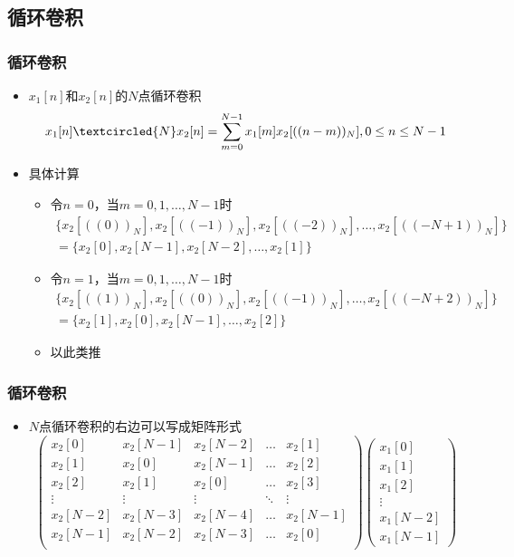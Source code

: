 \documentclass[CJKutf8,dvipsnames,table]{beamer}
\begin{document}
\begin{CJK*}{UTF8}{song}
  \section{循环卷积}
  
  \begin{frame}
    \frametitle{循环卷积}
    \begin{itemize}
    \item $x_1[n]$和$x_2[n]$的$N$点循环卷积
    \[
    	x_1[n] \textcircled{N} x_2[n]=\sum_{m=0}^{N-1}x_1[m]x_2[((n-m))_N], 0 \leq n \leq N-1
    \]    
    \item 具体计算
    	\begin{itemize}
		\item 令$n=0$，当$m=0, 1, \hdots, N-1$时
		\begin{align*}
			\{ x_2[((0))_N], x_2[((-1))_N], x_2[((-2))_N], \hdots, x_2[((-N+1))_N] \} & \\
		  = \{ x_2[0], x_2[N-1], x_2[N-2], \hdots, x_2[1] \} & 
		\end{align*}
		
		\item 令$n=1$，当$m=0, 1, \hdots, N-1$时
		\begin{align*}
			\{ x_2[((1))_N], x_2[((0))_N], x_2[((-1))_N], \hdots, x_2[((-N+2))_N] \} & \\
		  = \{ x_2[1], x_2[0], x_2[N-1], \hdots, x_2[2] \} & 
		\end{align*}	
		
		\item 以此类推	
		\end{itemize} 
	\end{itemize}
  \end{frame} 
        
  \begin{frame}
    \frametitle{循环卷积}
    \begin{itemize}
    \item $N$点循环卷积的右边可以写成矩阵形式
	\[
        \begin{pmatrix}
        x_2[0]      & x_2[N-1]   & x_2[N-2]  & \hdots & x_2[1] \\
        x_2[1]      & x_2[0]     & x_2[N-1]  & \hdots & x_2[2] \\
        x_2[2]      & x_2[1]     & x_2[0]    & \hdots & x_2[3] \\
        \vdots & \vdots & \vdots & \ddots & \vdots           \\
        x_2[N-2]    & x_2[N-3]   & x_2[N-4]  & \hdots & x_2[N-1] \\
        x_2[N-1]    & x_2[N-2]   & x_2[N-3]  & \hdots & x_2[0] \\
        \end{pmatrix}	
        \begin{pmatrix}
        x_1[0]  \\
        x_1[1]  \\
        x_1[2]  \\
         \vdots  \\
        x_1[N-2] \\
        x_1[N-1]
        \end{pmatrix}
	\]
		   

\end{itemize}
\end{frame}
\end{CJK*}
\end{document}
